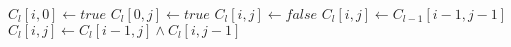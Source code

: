 \begin{algorithm}
    \begin{algorithmic}
                    \State $C_l[i,0] \gets true$
                \EndFor
                    \State $C_l[0,j] \gets true$
                \EndFor
                                \State $C_l[i,j] \gets false$
                            \Else
                                \State $C_l[i,j] \gets C_{l-1}[i-1,j-1]$
                            \EndIf
                        \Else
                            \State $C_l[i,j] \gets C_l[i-1,j] \land C_l[i,j-1]$
                        \EndIf
                    \EndFor
                \EndFor
            \EndFor
        \EndProcedure
    \end{algorithmic}
\end{algorithm}
